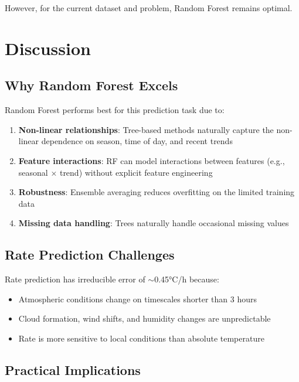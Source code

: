 \documentclass[11pt,letterpaper]{article}
\begin{document}
However, for the current dataset and problem, Random Forest remains optimal.

\section{Discussion}

\subsection{Why Random Forest Excels}

Random Forest performs best for this prediction task due to:

\begin{enumerate}
    \item \textbf{Non-linear relationships}: Tree-based methods naturally capture the non-linear dependence on season, time of day, and recent trends
    \item \textbf{Feature interactions}: RF can model interactions between features (e.g., seasonal × trend) without explicit feature engineering
    \item \textbf{Robustness}: Ensemble averaging reduces overfitting on the limited training data
    \item \textbf{Missing data handling}: Trees naturally handle occasional missing values
\end{enumerate}

\subsection{Rate Prediction Challenges}

Rate prediction has irreducible error of $\sim$0.45°C/h because:

\begin{itemize}
    \item Atmospheric conditions change on timescales shorter than 3 hours
    \item Cloud formation, wind shifts, and humidity changes are unpredictable
    \item Rate is more sensitive to local conditions than absolute temperature
\end{itemize}

\subsection{Practical Implications}
\end{document}
